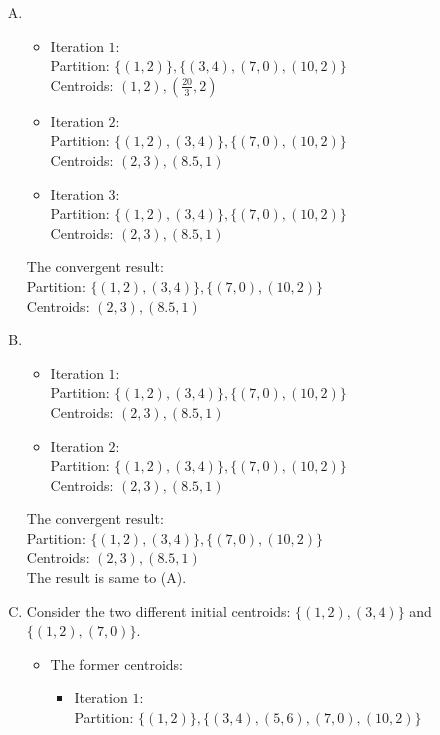 \newcommand{\z}{\mathbf{z}}

\begin{pr}$ $
\begin{enumerate}[(A)]
\item
\begin{itemize}
\item Iteration $1$:\\
Partition: $\{(1, 2)\}, \{(3, 4), (7, 0), (10, 2)\}$\\
Centroids: $(1, 2), (\frac{20}3, 2)$
\item Iteration $2$:\\
Partition: $\{(1, 2), (3, 4)\}, \{(7, 0), (10, 2)\}$\\
Centroids: $(2, 3), (8.5, 1)$
\item Iteration $3$:\\
Partition: $\{(1, 2), (3, 4)\}, \{(7, 0), (10, 2)\}$\\
Centroids: $(2, 3), (8.5, 1)$
\end{itemize}
The convergent result:\\
Partition: $\{(1, 2), (3, 4)\}, \{(7, 0), (10, 2)\}$\\
Centroids: $(2, 3), (8.5, 1)$
\item
\begin{itemize}
\item Iteration $1$:\\
Partition: $\{(1, 2), (3, 4)\}, \{(7, 0), (10, 2)\}$\\
Centroids: $(2, 3), (8.5, 1)$
\item Iteration $2$:\\
Partition: $\{(1, 2), (3, 4)\}, \{(7, 0), (10, 2)\}$\\
Centroids: $(2, 3), (8.5, 1)$
\end{itemize}
The convergent result:\\
Partition: $\{(1, 2), (3, 4)\}, \{(7, 0), (10, 2)\}$\\
Centroids: $(2, 3), (8.5, 1)$\\
The result is same to (A).
\item Consider the two different initial centroids: $\{(1, 2), (3, 4)\}$ and $\{(1, 2), (7, 0)\}$.\\
\begin{itemize}
\item The former centroids:
\begin{itemize}
\item Iteration $1$:\\
Partition: $\{(1, 2)\}, \{(3, 4), (5, 6), (7, 0), (10, 2)\}$\\

\end{itemize}
\end{itemize}
\end{enumerate}
\end{pr}
